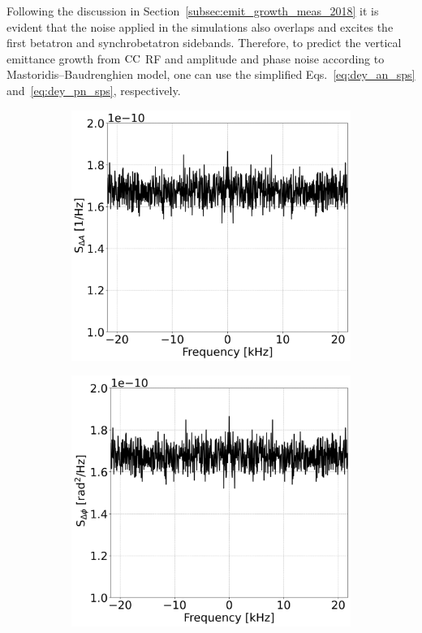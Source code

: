 Following the discussion in Section~\ref{subsec:emit_growth_meas_2018} it is evident that the noise applied in the simulations also overlaps and excites the first betatron and synchrobetatron sidebands. Therefore, to predict the vertical emittance growth from ${\mathrm{CC}}$ RF and amplitude and phase noise according to Mastoridis--Baudrenghien model, one can use the simplified Eqs.~\eqref{eq:dey_an_sps} and~\eqref{eq:dey_pn_sps}, respectively.


\begin{figure}[htp]
    \centering
    \begin{subfigure}{.45\textwidth}
        \centering
        \includegraphics[width=.95\linewidth]{images/Ch6/psd_amplitude_noise_example.png}  
    \end{subfigure}
    \begin{subfigure}{.45\textwidth}
        \centering
        \includegraphics[width=.95\linewidth]{images/Ch6/psd_phase_noise_example.png}

\end{subfigure}
\end{figure}
